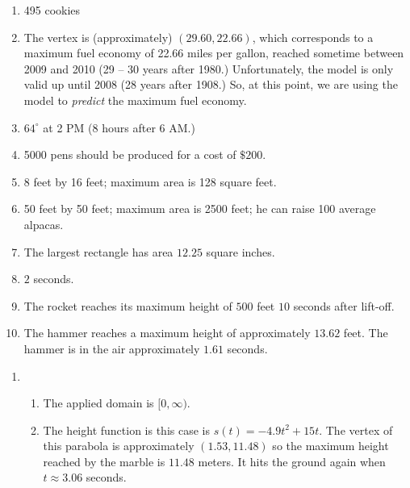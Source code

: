 \begin{exenum}
\begin{enumerate}
\setcounter{enumi}{\value{HW}}


\item 495 cookies

\item The vertex is (approximately) $(29.60, 22.66)$, which corresponds to a maximum fuel economy of 22.66 miles per gallon, reached sometime between 2009 and 2010 (29 -- 30 years after 1980.)  Unfortunately, the model is only valid up until 2008 (28 years after 1908.)  So, at this point, we are using the model to \textit{predict} the maximum fuel economy.



\item  $64^{\circ}$ at 2 PM (8 hours after 6 AM.)

\item  5000 pens should be produced for a cost of $\$200$.

\item 8 feet by 16 feet; maximum area is 128 square feet.

\item 50 feet by 50 feet;  maximum area is 2500 feet;  he can raise 100 average alpacas. 

\item The largest rectangle has area $12.25$ square inches.


\item  $2$ seconds.


\item  The rocket reaches its maximum height of $500$ feet $10$ seconds after lift-off.


\item  The hammer reaches a maximum height of approximately $13.62$ feet.  The hammer is in the air approximately $1.61$ seconds.  

\setcounter{HW}{\value{enumi}}
\end{enumerate}


\begin{enumerate}
\setcounter{enumi}{\value{HW}}


\item \begin{enumerate}

\item The applied domain is $[0, \infty)$.

\addtocounter{enumii}{2}

\item The height function is this case is $s(t) = -4.9t^{2} + 15t$.  The vertex of this parabola is approximately $(1.53, 11.48)$ so the maximum height reached by the marble is $11.48$ meters.  It hits the ground again when $t \approx 3.06$ seconds.


\end{enumerate}
\end{enumerate}
\end{exenum}
